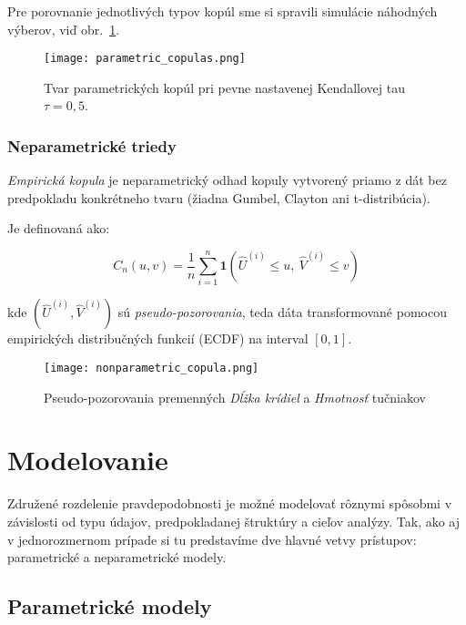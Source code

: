 Pre porovnanie jednotlivých typov kopúl sme si spravili simulácie náhodných výberov, viď obr.~\ref{fig:parametric_copulas}.

\begin{figure}[H]
    \centering
    \texttt{[image: parametric\_copulas.png]}
    \caption{Tvar parametrických kopúl pri pevne nastavenej Kendallovej tau $\tau = 0{,}5$.}
    \label{fig:parametric_copulas}
\end{figure}

\subsubsection{Neparametrické triedy}\label{subsubsec:nonparametric_copula}

\textit{Empirická kopula} je neparametrický odhad kopuly vytvorený priamo z dát bez predpokladu konkrétneho tvaru (žiadna Gumbel, Clayton ani t-distribúcia).

Je definovaná ako:

\begin{equation}
C_n(u, v) = \frac{1}{n} \sum_{i=1}^{n} \mathbf{1}\left( \hat{U}^{(i)} \leq u,\ \hat{V}^{(i)} \leq v \right)
\end{equation}

kde $\left(\hat{U}^{(i)}, \hat{V}^{(i)}\right)$ sú \textit{pseudo-pozorovania}, teda dáta transformované pomocou empirických distribučných funkcií (ECDF) na interval $[0,1]$.

\begin{figure}[H]
    \centering
    \texttt{[image: nonparametric\_copula.png]}
    \caption{Pseudo-pozorovania premenných \textit{Dĺžka krídiel} a \textit{Hmotnosť} tučniakov}
    \label{fig:nonparametric_copula}
\end{figure}

\section{Modelovanie}\label{sec:modelovanie}

Združené rozdelenie pravdepodobnosti je možné modelovať rôznymi spôsobmi v závislosti od typu údajov, predpokladanej štruktúry a cieľov analýzy. Tak, ako aj v jednorozmernom prípade si tu predstavíme dve hlavné vetvy prístupov: parametrické a neparametrické modely.

\subsection{Parametrické modely}\label{subsec:joint_param_models}

